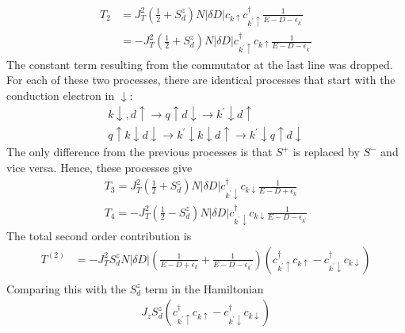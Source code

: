 \begin{equation}\begin{aligned}
	T_2 &= J_T^2 \left(\frac{1}{2}+S_d^z\right) N |\delta D|c_{k\uparrow}c^\dagger_{k^\prime \uparrow} \frac{1}{E - D - \epsilon_{k^\prime}} \\
	    &=-J_T^2 \left(\frac{1}{2}+S_d^z\right) N |\delta D|c^\dagger_{k^\prime \uparrow} c_{k\uparrow}\frac{1}{E - D - \epsilon_{k^\prime}}
\end{aligned}\end{equation}
The constant term resulting from the commutator at the last line was dropped.
For each of these two processes, there are identical processes that start with the conduction electron in \(\downarrow\):
\begin{gather}
k \downarrow, d\uparrow \rightarrow q \uparrow d \downarrow \rightarrow k^\prime \downarrow d\uparrow\\
q \uparrow k \downarrow d\downarrow \rightarrow k^\prime \downarrow k \downarrow d\uparrow \rightarrow k^\prime\downarrow q \uparrow d\downarrow
\end{gather}
The only difference from the previous processes is that \(S^+\) is replaced by \(S^-\) and vice versa.
Hence, these  processes give
\begin{gather}
	T_3 = J_T^2\left(\frac{1}{2} + S_d^z\right)N|\delta D|c^\dagger_{k^\prime \downarrow}c_{k\downarrow}\frac{1}{E - D + \epsilon_k}\\
	T_4 = -J_T^2 \left(\frac{1}{2}-S_d^z\right) N |\delta D|c^\dagger_{k^\prime\downarrow} c_{k\downarrow} \frac{1}{E - D - \epsilon_{k^\prime}}
\end{gather}
The total second order contribution is
\begin{equation}\begin{aligned}
	T^{(2)} &= -J_T^2 S_d^z N|\delta D|\left(\frac{1}{E - D + \epsilon_k} + \frac{1}{E - D - \epsilon_{k^\prime}}\right)\left(c^\dagger_{k^\prime \uparrow}c_{k\uparrow} - c^\dagger_{k^\prime \downarrow}c_{k\downarrow}\right)\\
\end{aligned}\end{equation}
Comparing this with the \(S_d^z\) term in the Hamiltonian
\begin{equation}\begin{aligned}
	J_z S_d^z\left(c^\dagger_{k^\prime \uparrow}c_{k\uparrow} - c^\dagger_{k^\prime \downarrow}c_{k\downarrow}\right)\\
\end{aligned}\end{equation}

